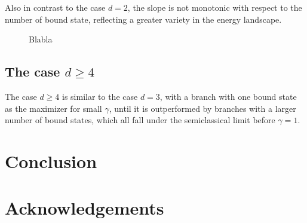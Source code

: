 \documentclass[10pt,a4paper,reqno]{amsart}
\begin{document}
Also in contrast to the case $d = 2$, the slope is not monotonic with
respect to the number of bound state, reflecting a greater variety in
the energy landscape.

\begin{figure}[H]
  \centering
  \caption{Blabla}
  \label{fig:3D}
\end{figure}
\subsection{The case $d \geq 4$}
The case $d \geq 4$ is similar to the case $d = 3$, with a branch with
one bound state as the maximizer for small $\gamma$, until it is
outperformed by branches with a larger number of bound states, which
all fall under the semiclassical limit before $\gamma = 1$.
\section{Conclusion}

\section*{Acknowledgements}


\end{document}

